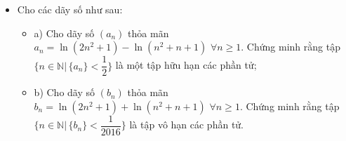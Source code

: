 \documentclass[11pt]{scrartcl}
\begin{document}
\begin{itemize}[label=, leftmargin=0em, itemsep=-0em]

    \item \begin{btvn}Cho các dãy số như sau:
        \begin{itemize}[label=]
            \item a) Cho dãy số $(a_n)$ thỏa mãn  $a_n=\ln (2n^2+1)-\ln (n^2+n+1)\,\,\forall n\geq 1.$ Chứng minh rằng tập $\{n\in\mathbb{N}|\,\{a_n\}<\dfrac{1}{2}\}$ là một tập hữu hạn các phần tử;
            \item b) Cho dãy số $(b_n)$ thỏa mãn $b_n=\ln (2n^2+1)+\ln (n^2+n+1)\,\,\forall n\geq 1$. Chứng minh rằng tập $\{n\in\mathbb{N}|\,\{b_n\}<\dfrac{1}{2016}\}$ là tập vô hạn các phần tử.
        \end{itemize}
    \end{btvn}

\end{itemize}
\end{document}
